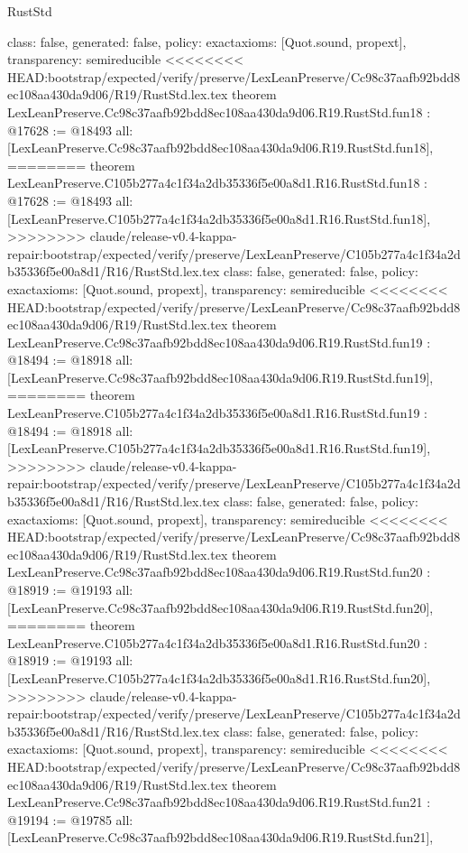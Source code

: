 \begin{lexlean}{RustStd}
\begin{coremodule}
{\begin{coremodule}
{{{{{{{{{{{{{{{{{{{{{  class: false,
  generated: false,
  policy: exact{axioms: [Quot.sound, propext]},
  transparency: semireducible
}
<<<<<<<< HEAD:bootstrap/expected/verify/preserve/LexLeanPreserve/Cc98c37aafb92bdd8ec108aa430da9d06/R19/RustStd.lex.tex
theorem LexLeanPreserve.Cc98c37aafb92bdd8ec108aa430da9d06.R19.RustStd.fun18 : @17628 := @18493 {
  all: [LexLeanPreserve.Cc98c37aafb92bdd8ec108aa430da9d06.R19.RustStd.fun18],
========
theorem LexLeanPreserve.C105b277a4c1f34a2db35336f5e00a8d1.R16.RustStd.fun18 : @17628 := @18493 {
  all: [LexLeanPreserve.C105b277a4c1f34a2db35336f5e00a8d1.R16.RustStd.fun18],
>>>>>>>> claude/release-v0.4-kappa-repair:bootstrap/expected/verify/preserve/LexLeanPreserve/C105b277a4c1f34a2db35336f5e00a8d1/R16/RustStd.lex.tex
  class: false,
  generated: false,
  policy: exact{axioms: [Quot.sound, propext]},
  transparency: semireducible
}
<<<<<<<< HEAD:bootstrap/expected/verify/preserve/LexLeanPreserve/Cc98c37aafb92bdd8ec108aa430da9d06/R19/RustStd.lex.tex
theorem LexLeanPreserve.Cc98c37aafb92bdd8ec108aa430da9d06.R19.RustStd.fun19 : @18494 := @18918 {
  all: [LexLeanPreserve.Cc98c37aafb92bdd8ec108aa430da9d06.R19.RustStd.fun19],
========
theorem LexLeanPreserve.C105b277a4c1f34a2db35336f5e00a8d1.R16.RustStd.fun19 : @18494 := @18918 {
  all: [LexLeanPreserve.C105b277a4c1f34a2db35336f5e00a8d1.R16.RustStd.fun19],
>>>>>>>> claude/release-v0.4-kappa-repair:bootstrap/expected/verify/preserve/LexLeanPreserve/C105b277a4c1f34a2db35336f5e00a8d1/R16/RustStd.lex.tex
  class: false,
  generated: false,
  policy: exact{axioms: [Quot.sound, propext]},
  transparency: semireducible
}
<<<<<<<< HEAD:bootstrap/expected/verify/preserve/LexLeanPreserve/Cc98c37aafb92bdd8ec108aa430da9d06/R19/RustStd.lex.tex
theorem LexLeanPreserve.Cc98c37aafb92bdd8ec108aa430da9d06.R19.RustStd.fun20 : @18919 := @19193 {
  all: [LexLeanPreserve.Cc98c37aafb92bdd8ec108aa430da9d06.R19.RustStd.fun20],
========
theorem LexLeanPreserve.C105b277a4c1f34a2db35336f5e00a8d1.R16.RustStd.fun20 : @18919 := @19193 {
  all: [LexLeanPreserve.C105b277a4c1f34a2db35336f5e00a8d1.R16.RustStd.fun20],
>>>>>>>> claude/release-v0.4-kappa-repair:bootstrap/expected/verify/preserve/LexLeanPreserve/C105b277a4c1f34a2db35336f5e00a8d1/R16/RustStd.lex.tex
  class: false,
  generated: false,
  policy: exact{axioms: [Quot.sound, propext]},
  transparency: semireducible
}
<<<<<<<< HEAD:bootstrap/expected/verify/preserve/LexLeanPreserve/Cc98c37aafb92bdd8ec108aa430da9d06/R19/RustStd.lex.tex
theorem LexLeanPreserve.Cc98c37aafb92bdd8ec108aa430da9d06.R19.RustStd.fun21 : @19194 := @19785 {
  all: [LexLeanPreserve.Cc98c37aafb92bdd8ec108aa430da9d06.R19.RustStd.fun21],
}}}}}}}}}}}}}}}}}}}}}}}}
\end{coremodule}}
\end{coremodule}
\end{lexlean}
